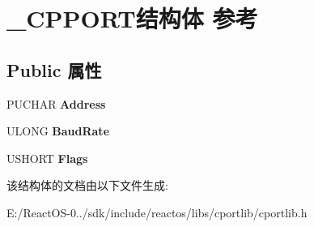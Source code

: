 \hypertarget{struct___c_p_p_o_r_t}{}\section{\+\_\+\+C\+P\+P\+O\+R\+T结构体 参考}
\label{struct___c_p_p_o_r_t}
\subsection*{Public 属性}
\begin{DoxyCompactItemize}
\item 
\mbox{\label{struct___c_p_p_o_r_t_a7b14623503e4f38f77ab8a350cd1cfbb}} 
P\+U\+C\+H\+AR {\bfseries Address}
\item 
\mbox{\label{struct___c_p_p_o_r_t_a83593659bafcbf449740b423de7ff4b4}} 
U\+L\+O\+NG {\bfseries Baud\+Rate}
\item 
\mbox{\label{struct___c_p_p_o_r_t_abd0cbd415966ba40f9ca6d0e8010c288}} 
U\+S\+H\+O\+RT {\bfseries Flags}
\end{DoxyCompactItemize}


该结构体的文档由以下文件生成\+:\begin{DoxyCompactItemize}
\item 
E\+:/\+React\+O\+S-\/0../sdk/include/reactos/libs/cportlib/cportlib.\+h\end{DoxyCompactItemize}
